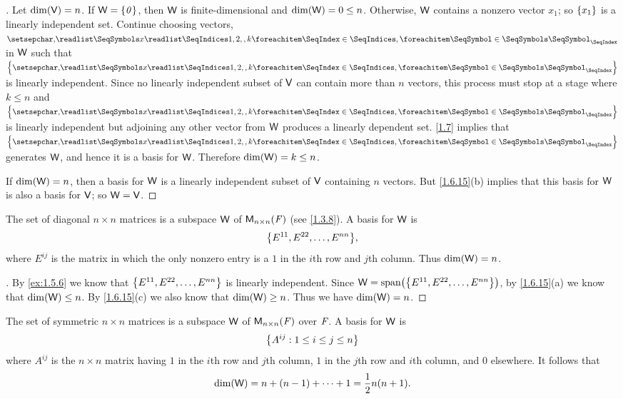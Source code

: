\begin{proof}[]
  Let \(\dim(\mathsf{V}) = n\).
  If \(\mathsf{W} = \left\lbrace\mathit{0}\right\rbrace\), then \(\mathsf{W}\) is finite-dimensional and \(\dim(\mathsf{W}) = 0 \leq n\).
  Otherwise, \(\mathsf{W}\) contains a nonzero vector \(x_1\);
  so \(\left\lbrace x_1\right\rbrace\) is a linearly independent set.
  Continue choosing vectors, \(\seq{x}{1,2,,k}\) in \(\mathsf{W}\) such that \(\set{\seq{x}{1,2,,k}}\) is linearly independent.
  Since no linearly independent subset of \(\mathsf{V}\) can contain more than \(n\) vectors, this process must stop at a stage where \(k \leq n\) and \(\set{\seq{x}{1,2,,k}}\) is linearly independent but adjoining any other vector from \(\mathsf{W}\) produces a linearly dependent set.
  \cref{1.7} implies that \(\set{\seq{x}{1,2,,k}}\) generates \(\mathsf{W}\), and hence it is a basis for \(\mathsf{W}\).
  Therefore \(\dim(\mathsf{W}) = k \leq n\).

  If \(\dim(\mathsf{W}) = n\), then a basis for \(\mathsf{W}\) is a linearly independent subset of \(\mathsf{V}\) containing \(n\) vectors.
  But \cref{1.6.15}(b) implies that this basis for \(\mathsf{W}\) is also a basis for \(\mathsf{V}\);
  so \(\mathsf{W} = \mathsf{V}\).
\end{proof}

\begin{eg}\label{1.6.17}
  The set of diagonal \(n \times n\) matrices is a subspace \(\mathsf{W}\) of \(\mathsf{M}_{{n} \times n}({\mathit{F}})\)
  (see \cref{1.3.8}).
  A basis for \(\mathsf{W}\) is
  \[
    \set{E^{1 1}, E^{2 2}, \dots, E^{n n}},
  \]
  where \(E^{i j}\) is the matrix in which the only nonzero entry is a \(1\) in the \(i\)th row and \(j\)th column.
  Thus \(\dim(\mathsf{W}) = n\).
\end{eg}

\begin{proof}[]
  By \cref{ex:1.5.6} we know that \(\left\lbrace E^{1 1}, E^{2 2}, \dots, E^{n n}\right\rbrace\) is linearly independent.
  Since \(\W = \spn{\set{E^{1 1}, E^{2 2}, \dots, E^{n n}}}\), by \cref{1.6.15}(a) we know that \(\dim(\mathsf{W}) \leq n\).
  By \cref{1.6.15}(c) we also know that \(\dim(\mathsf{W}) \geq n\).
  Thus we have \(\dim(\mathsf{W}) = n\).
\end{proof}

\begin{eg}\label{1.6.18}
  The set of symmetric \(n \times n\) matrices is a subspace \(\mathsf{W}\) of \(\mathsf{M}_{{n} \times n}({\mathit{F}})\) over \(\mathit{F}\).
  A basis for \(\mathsf{W}\) is
  \[
    \left\lbrace A^{i j} : 1 \leq i \leq j \leq n\right\rbrace
  \]
  where \(A^{i j}\) is the \(n \times n\) matrix having \(1\) in the \(i\)th row and \(j\)th column, \(1\) in the \(j\)th row and \(i\)th column, and \(0\) elsewhere.
  It follows that
  \[
    \dim(\mathsf{W}) = n + (n - 1) + \cdots + 1 = \frac{1}{2} n(n + 1).
  \]
\end{eg}


